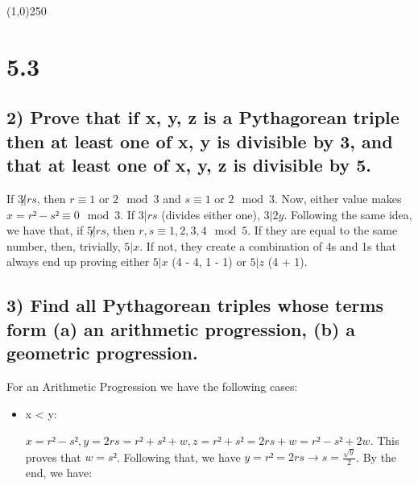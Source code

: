 \documentclass[11pt]{article}
\begin{document}
\begin{center}
\line(1,0){250}
\end{center}

\section*{5.3}
\label{sec:orgd0f3f00}

\subsection*{2) Prove that if x, y, z is a Pythagorean triple then at least one of x, y is divisible by 3, and that at least one of x, y, z is divisible by 5.}
\label{sec:org7a1c672}

If \(3\not|rs\), then \(r \equiv 1\) or \(2 \mod 3\) and \(s \equiv 1\) or \(2 \mod 3\). Now, either value makes \(x = r² - s² \equiv 0 \mod 3\). If \(3|rs\) (divides either one), \(3|2y\).
Following the same idea, we have that, if \(5\not|rs\), then \(r, s \equiv 1, 2, 3, 4 \mod 5\). If they are equal to the same number, then, trivially, \(5|x\). If not, they create a combination of 4s and 1s that always end up proving either \(5|x\) (4 - 4, 1 - 1) or \(5|z\) (4 + 1).

\subsection*{3) Find all Pythagorean triples whose terms form (a) an arithmetic progression, (b) a geometric progression.}
\label{sec:org73937b2}
For an Arithmetic Progression we have the following cases:
\begin{itemize}
\item x < y:

\(x = r² - s², y = 2rs = r² + s² + w, z = r² + s² = 2rs + w = r² - s² + 2w\). This proves that \(w = s²\). Following that, we have \(y = r² = 2rs \to s = \frac{\sqrt{y}}{2}\). By the end, we have:
\end{itemize}
\end{document}
